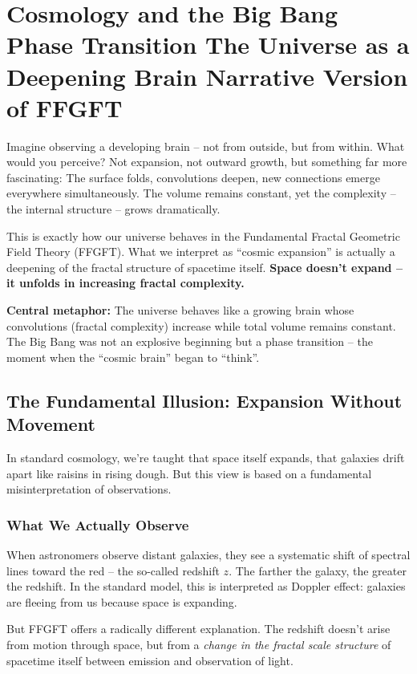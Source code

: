 \chapter{Cosmology and the Big Bang Phase Transition  The Universe as a Deepening Brain  Narrative Version of FFGFT}



Imagine observing a developing brain -- not from outside, but from within. What would you perceive? Not expansion, not outward growth, but something far more fascinating: The surface folds, convolutions deepen, new connections emerge everywhere simultaneously. The volume remains constant, yet the complexity -- the internal structure -- grows dramatically.

This is exactly how our universe behaves in the Fundamental Fractal Geometric Field Theory (FFGFT). What we interpret as ``cosmic expansion'' is actually a deepening of the fractal structure of spacetime itself. \textbf{Space doesn't expand -- it unfolds in increasing fractal complexity.}

\textbf{Central metaphor:} The universe behaves like a growing brain whose convolutions (fractal complexity) increase while total volume remains constant. The Big Bang was not an explosive beginning but a phase transition -- the moment when the ``cosmic brain'' began to ``think''.

\section{The Fundamental Illusion: Expansion Without Movement}

In standard cosmology, we're taught that space itself expands, that galaxies drift apart like raisins in rising dough. But this view is based on a fundamental misinterpretation of observations.

\subsection{What We Actually Observe}

When astronomers observe distant galaxies, they see a systematic shift of spectral lines toward the red -- the so-called redshift $z$. The farther the galaxy, the greater the redshift. In the standard model, this is interpreted as Doppler effect: galaxies are fleeing from us because space is expanding.

But FFGFT offers a radically different explanation. The redshift doesn't arise from motion through space, but from a \textit{change in the fractal scale structure} of spacetime itself between emission and observation of light.

